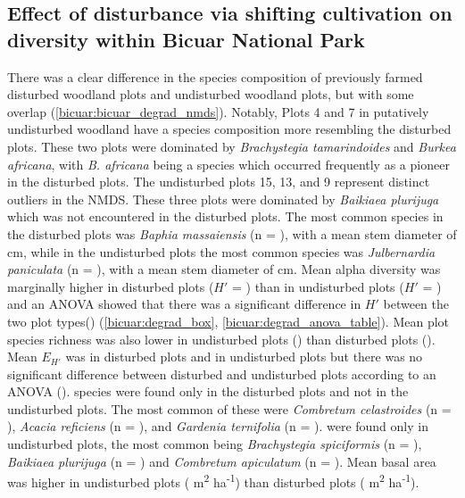 \begin{refsection}
\subsection{Effect of disturbance via shifting cultivation on diversity within Bicuar National Park}
\label{bicuar:ssec:disturbance}

There was a clear difference in the species composition of previously farmed disturbed woodland plots and undisturbed woodland plots, but with some overlap (\autoref{bicuar:bicuar_degrad_nmds}). Notably, Plots 4 and 7 in putatively undisturbed woodland have a species composition more resembling the disturbed plots. These two plots were dominated by \textit{Brachystegia tamarindoides} and \textit{Burkea africana}, with \textit{B. africana} being a species which occurred frequently as a pioneer in the disturbed plots. The undisturbed plots 15, 13, and 9 represent distinct outliers in the NMDS. These three plots were dominated by \textit{Baikiaea plurijuga} which was not encountered in the disturbed plots. The most common species in the disturbed plots was \textit{Baphia massaiensis} (n = \nbmdegrad{}), with a mean stem diameter of \bmdbhdegrad{} cm, while in the undisturbed plots the most common species was \textit{Julbernardia paniculata} (n = \njpdegrad{}), with a mean stem diameter of \jpdbhbicuar{} cm. Mean alpha diversity was marginally higher in disturbed plots ($H'$ = \degradshannon{}) than in undisturbed plots ($H'$ = \bicuarsubshannon{}) and an ANOVA showed that there was a significant difference in $H'$ between the two plot types(\lmshannondegrad{}) (\autoref{bicuar:degrad_box}, \autoref{bicuar:degrad_anova_table}). Mean plot species richness was also lower in undisturbed plots (\bicuarsubrich{}) than disturbed plots (\degradrich{}). Mean $E_{H'}$ was \degradequit{} in disturbed plots and \bicuarsubequit{} in undisturbed plots but there was no significant difference between disturbed and undisturbed plots according to an ANOVA (\lmequitdegrad{}). \ndegradonlyspecies{} species were found only in the disturbed plots and not in the undisturbed plots. The most common of these were \textit{Combretum celastroides} (n = \nccdegrad{}), \textit{Acacia reficiens} (n = \nvrdegrad{}), and \textit{Gardenia ternifolia} (n = \ngtdegrad{}). \nbigonlyspecies{} were found only in undisturbed plots, the most common being \textit{Brachystegia spiciformis} (n = \nbsbig{}), \textit{Baikiaea plurijuga} (n = \nbpbig{}) and \textit{Combretum apiculatum} (n = \ncabig{}). Mean basal area was higher in undisturbed plots (\bicuarsubba{} m\textsuperscript{2} ha\textsuperscript{-1}) than disturbed plots (\degradba{} m\textsuperscript{2} ha\textsuperscript{-1}). 


\end{refsection}
